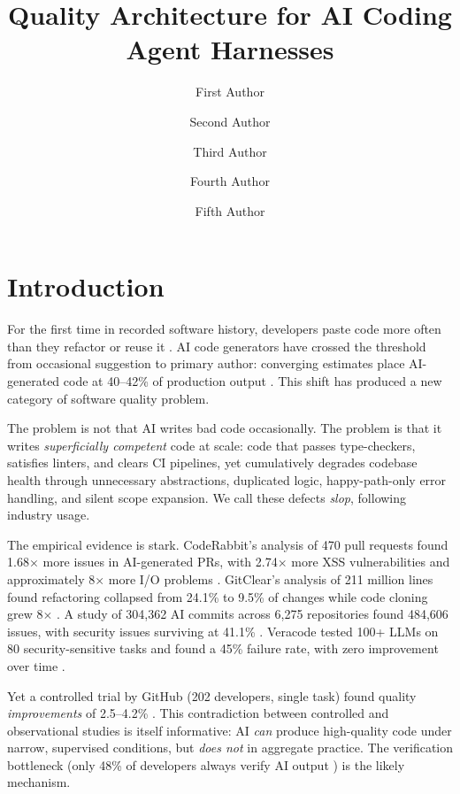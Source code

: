 \documentclass[11pt, a4paper, copyright]{googledeepmind}
\title{Quality Architecture for AI Coding Agent Harnesses}
\author[1]{First Author}
\author[2]{Second Author}
\author[2]{Third Author}
\author[1]{Fourth Author}
\author[1]{Fifth Author}
\affil[*]{Equal Contribution}
\affil[1]{Affiliation 1}
\affil[2]{Affiliation 2}
\begin{document}
\maketitle

\section{Introduction}
\label{sec:intro}

For the first time in recorded software history, developers paste code more often than they refactor or reuse it \citep{gitclear2025}. AI code generators have crossed the threshold from occasional suggestion to primary author: converging estimates place AI-generated code at 40--42\% of production output \citep{gitclear2025, sonar2026}. This shift has produced a new category of software quality problem.

The problem is not that AI writes bad code occasionally. The problem is that it writes \emph{superficially competent} code at scale: code that passes type-checkers, satisfies linters, and clears CI pipelines, yet cumulatively degrades codebase health through unnecessary abstractions, duplicated logic, happy-path-only error handling, and silent scope expansion. We call these defects \emph{slop}, following industry usage.

The empirical evidence is stark. CodeRabbit's analysis of 470 pull requests found 1.68$\times$ more issues in AI-generated PRs, with 2.74$\times$ more XSS vulnerabilities and approximately 8$\times$ more I/O problems \citep{coderabbit2025}. GitClear's analysis of 211 million lines found refactoring collapsed from 24.1\% to 9.5\% of changes while code cloning grew 8$\times$ \citep{gitclear2025}. A study of 304,362 AI commits across 6,275 repositories found 484,606 issues, with security issues surviving at 41.1\% \citep{debtboom2026}. Veracode tested 100+ LLMs on 80 security-sensitive tasks and found a 45\% failure rate, with zero improvement over time \citep{veracode2025}.

Yet a controlled trial by GitHub (202 developers, single task) found quality \emph{improvements} of 2.5--4.2\% \citep{github2024rct}. This contradiction between controlled and observational studies is itself informative: AI \emph{can} produce high-quality code under narrow, supervised conditions, but \emph{does not} in aggregate practice. The verification bottleneck (only 48\% of developers always verify AI output \citep{sonar2026}) is the likely mechanism.
\end{document}
